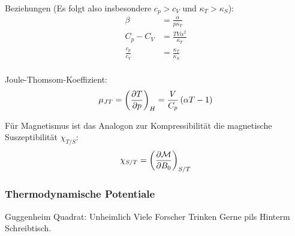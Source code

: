 \documentclass[11pt]{article}
\numberwithin{equation}{section}
\begin{document}
        Beziehungen (Es folgt also insbesondere $c_p > c_V$ und
        $\kappa_T > \kappa_S$):
        \begin{equation}
          \begin{aligned}
            \beta &= \frac{\alpha}{p \kappa_T} \\
            C_p - C_V &= \frac{TV\alpha^2}{\kappa_T} \\
            \frac{c_p}{c_V} &= \frac{\kappa_T}{\kappa_S} \\
          \end{aligned}
        \end{equation}

        Joule-Thomsom-Koeffizient:
        \begin{equation}
          \mu_{JT} = \left( \frac{\partial T}{\partial p} \right)_H = \frac{V}{C_p}\left(\alpha T - 1\right)
        \end{equation}

        Für Magnetismus ist das Analogon zur Kompressibilität die magnetische Suszeptibilität $\chi_{T/S}$:
        \begin{equation}
          \chi_{S/T} = \left(\frac{\partial \mathcal{M}}{\partial B_0}\right)_{S/T}
        \end{equation}

      \subsubsection{Thermodynamische Potentiale}
        Guggenheim Quadrat:
        Unheimlich Viele Forscher Trinken Gerne pils Hinterm Schreibtisch.
\end{document}
